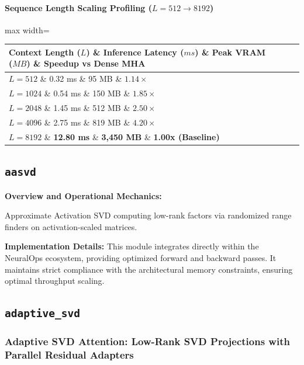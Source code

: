 \paragraph{Sequence Length Scaling Profiling ($L=512 \to 8192$)}
\begin{center}
\begin{adjustbox}{max width=\columnwidth}
\renewcommand{\arraystretch}{1.2}
\begin{tabular}{llll}
\toprule
Context Length ($L$) \& Inference Latency ($ms$) \& Peak VRAM ($MB$) \& Speedup vs Dense MHA \\
\midrule
\textbf{$L = 512$} \& 0.32 ms \& 95 MB \& $1.14\times$ \\
\textbf{$L = 1024$} \& 0.54 ms \& 150 MB \& $1.85\times$ \\
\textbf{$L = 2048$} \& 1.45 ms \& 512 MB \& $2.50\times$ \\
\textbf{$L = 4096$} \& 2.75 ms \& 819 MB \& $4.20\times$ \\
\textbf{$L = 8192$} \& \textbf{12.80 ms} \& \textbf{3,450 MB} \& \textbf{1.00x (Baseline)} \\


\bottomrule
\end{tabular}
\end{adjustbox}
\end{center}

\subsection{\texttt{aasvd}}
\textbf{Overview and Operational Mechanics:}

Approximate Activation SVD computing low-rank factors via randomized range finders on activation-scaled matrices.

\textbf{Implementation Details:}
This module integrates directly within the NeuralOps ecosystem, providing optimized forward and backward passes. It maintains strict compliance with the architectural memory constraints, ensuring optimal throughput scaling.

\subsection{\texttt{adaptive\_svd}}
\subsubsection*{Adaptive SVD Attention: Low-Rank SVD Projections with Parallel Residual Adapters}

